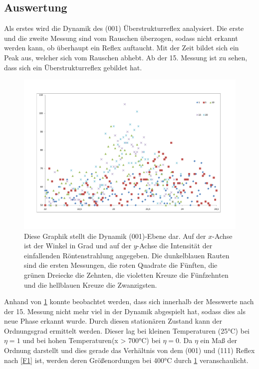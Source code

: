 \documentclass[
	a4paper,
	12pt,
	pagesize,
	ngerman
]{scrartcl}
\begin{document}
\subsection{Auswertung}
Als erstes wird die Dynamik des (001) Überstrukturreflex analysiert. Die erste und die zweite Messung sind vom Rauschen überzogen, sodass nicht erkannt werden kann, ob überhaupt ein Reflex auftaucht. Mit der Zeit bildet sich ein Peak aus, welcher sich vom Rauschen abhebt. Ab der 15. Messung ist zu sehen, dass sich ein Überstrukturreflex gebildet hat.
\begin{figure}[h!]
    \centering
    \includegraphics[scale = 0.5]{Bragg_Punkte.pdf}
    \caption{Diese Graphik stellt die Dynamik (001)-Ebene dar. Auf der $x$-Achse ist der Winkel in Grad und auf der $y$-Achse die Intensität der einfallenden Röntenstrahlung angegeben. Die dunkelblauen Rauten sind die ersten Messungen, die roten Quadrate die Fünften, die grünen Dreiecke die Zehnten, die violetten Kreuze die Fünfzehnten und die hellblauen Kreuze die Zwanzigsten.}
    \label{A3}
\end{figure}
Anhand von \cref{A3} konnte beobachtet werden, dass sich innerhalb der Messwerte nach der 15. Messung nicht mehr viel in der Dynamik abgespielt hat, sodass dies als neue Phase erkannt wurde. Durch diesen stationären Zustand kann der Ordnungsgrad ermittelt werden. Dieser lag bei kleinen Temperaturen (25°C) bei $\eta = 1$ und bei hohen Temperaturen(x > 700°C) bei $\eta = 0$. Da $\eta$ ein Maß der Ordnung darstellt und dies gerade das Verhältnis von dem (001) und (111) Reflex nach \cref{F1} ist, werden deren Größenordungen bei 400°C durch \cref{A3} veranschaulicht.
\end{document}
